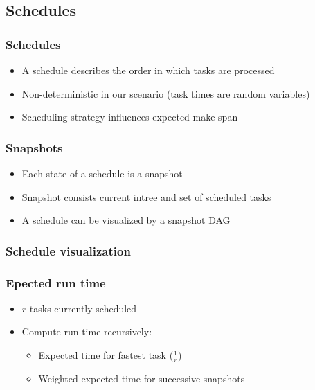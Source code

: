 \documentclass{beamer}
\newcommand{\todo}[1]{ {\color{red}{#1} }}
\begin{document}
\todo{Nonpreemtiv, etc (precise problem description!)}

\subsection{Schedules}
\label{sec:schedules}

\begin{frame}
  \frametitle{Schedules}
  \begin{itemize}
  \item A schedule describes the order in which tasks are processed
  \item Non-deterministic in our scenario (task times are random variables)
  \item Scheduling strategy influences expected make span
  \end{itemize}
\end{frame}

\begin{frame}
  \frametitle{Snapshots}
  \begin{itemize}
  \item Each state of a schedule is a snapshot
  \item Snapshot consists current intree and set of scheduled tasks
  \item A schedule can be visualized by a snapshot DAG
  \end{itemize}
\end{frame}

\begin{frame}
  \frametitle{Schedule visualization}
\end{frame}

\begin{frame}
  \frametitle{Epected run time}
  \begin{itemize}
  \item $r$ tasks currently scheduled
  \item Compute run time recursively:
    \begin{itemize}
    \item Expected time for fastest task ($\frac{1}{r}$)
    \item Weighted expected time for successive snapshots
    \end{itemize}
  \end{itemize}
\end{frame}
\end{document}
